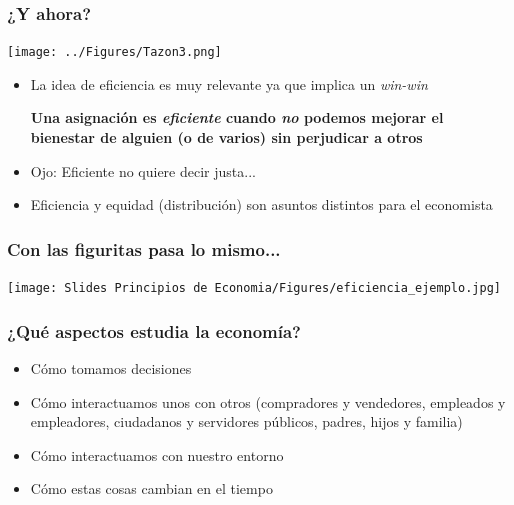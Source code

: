 \documentclass{beamer}
\begin{document}
\begin{frame}
\frametitle{¿Y ahora?}
    \begin{center}
        \texttt{[image: ../Figures/Tazon3.png]}
    \end{center}
    \begin{itemize}
        \small
        \item La idea de eficiencia es muy relevante ya que implica un \textit{win-win}
        \begin{center}
            \begin{boxA} 
                \textbf{Una asignación es \textit{eficiente} cuando \textit{no} podemos mejorar el bienestar de alguien (o de varios) sin perjudicar a otros}
            \end{boxA}
        \end{center}
        \item Ojo: Eficiente no quiere decir justa...
        \item Eficiencia y equidad (distribución) son asuntos distintos para el economista
    \end{itemize}
\end{frame}

\begin{frame}
\frametitle{Con las figuritas pasa lo mismo...}
    \begin{center}
    \texttt{[image: Slides Principios de Economia/Figures/eficiencia\_ejemplo.jpg]}
    \end{center}
\end{frame}


\begin{frame}
    \frametitle{¿Qu\'{e} aspectos estudia la economía?}
    \begin{itemize}
        \item Cómo tomamos decisiones  \vspace{2mm}
        \item Cómo interactuamos unos con otros (compradores y vendedores, empleados y empleadores, ciudadanos y servidores públicos, padres, hijos y familia) \vspace{2mm}
        \item Cómo interactuamos con nuestro entorno \vspace{2mm}
        \item Cómo estas cosas cambian en el tiempo  
    \end{itemize}
\end{frame}
\end{document}
